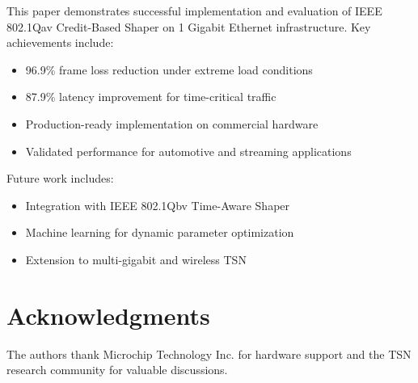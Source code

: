 \documentclass[10pt, journal, compsoc]{IEEEtran}
\begin{document}
This paper demonstrates successful implementation and evaluation of IEEE 802.1Qav Credit-Based Shaper on 1 Gigabit Ethernet infrastructure. Key achievements include:

\begin{itemize}
    \item 96.9\% frame loss reduction under extreme load conditions
    \item 87.9\% latency improvement for time-critical traffic
    \item Production-ready implementation on commercial hardware
    \item Validated performance for automotive and streaming applications
\end{itemize}

Future work includes:
\begin{itemize}
    \item Integration with IEEE 802.1Qbv Time-Aware Shaper
    \item Machine learning for dynamic parameter optimization
    \item Extension to multi-gigabit and wireless TSN
\end{itemize}

\section{Acknowledgments}

The authors thank Microchip Technology Inc. for hardware support and the TSN research community for valuable discussions.



\end{document}
